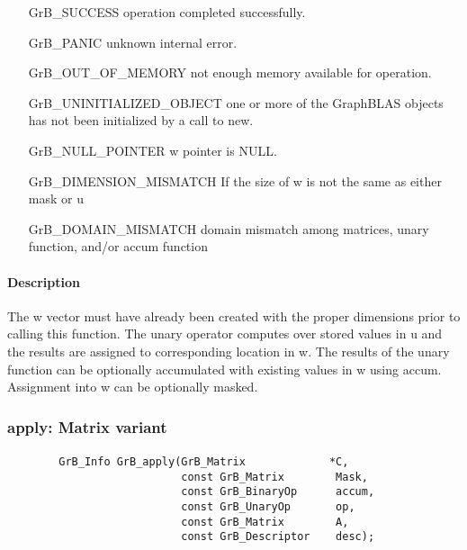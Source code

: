 \begin{itemize}[leftmargin=2.1in]
\item[{\sf GrB\_SUCCESS}]     operation completed successfully.
\item[{\sf GrB\_PANIC}]        unknown internal error.

\item[{\sf GrB\_OUT\_OF\_MEMORY}]          not enough memory available for operation.
\item[{\sf GrB\_UNINITIALIZED\_OBJECT}]          one or more of the GraphBLAS objects has
                                    not been initialized by a call to {\sf new}.
\item[{\sf GrB\_NULL\_POINTER}]    {\sf w} pointer is {\sf NULL}.

\item[{\sf GrB\_DIMENSION\_MISMATCH}]            
        If the size of {\sf w} is not the same as either {\sf mask} or {\sf u}
\item[{\sf GrB\_DOMAIN\_MISMATCH}]  
        domain mismatch among matrices, unary function, and/or
        accum function 
\end{itemize}

\paragraph{Description}

The {\sf w} vector must have already been created with the proper dimensions
prior to calling this function.  The unary operator computes over stored values in {\sf u} and the results are assigned to corresponding location in {\sf w}.
The results of the unary function can be optionally accumulated with existing values in {\sf w} using {\sf accum}.  Assignment into {\sf w} can be optionally masked.


\subsubsection{{\sf apply}: Matrix variant}

\paragraph{\syntax}

\begin{verbatim}
        GrB_Info GrB_apply(GrB_Matrix             *C,
                           const GrB_Matrix        Mask,
                           const GrB_BinaryOp      accum,
                           const GrB_UnaryOp       op,
                           const GrB_Matrix        A,
                           const GrB_Descriptor    desc);
\end{verbatim}

